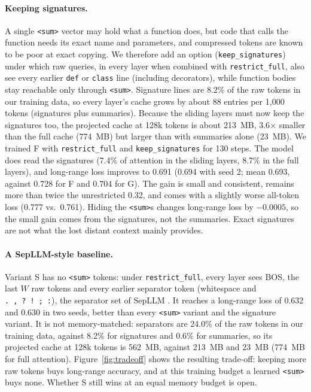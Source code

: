 \documentclass[11pt]{article}
\newcommand{\sumtok}{\texttt{<sum>}}
\begin{document}
\paragraph{Keeping signatures.}
A single \sumtok{} vector may hold what a function does, but code that calls
the function needs its exact name and parameters, and compressed tokens are
known to be poor at exact copying. We therefore add an option
(\texttt{keep\_signatures}) under which raw queries, in every layer when
combined with \texttt{restrict\_full}, also see every earlier \texttt{def}
or \texttt{class} line (including decorators), while function bodies stay
reachable only through \sumtok{}. Signature lines are 8.2\% of the raw
tokens in our training data, so every layer's cache grows by about 88
entries per 1{,}000 tokens (signatures plus summaries). Because the sliding
layers must now keep the signatures too, the projected cache at 128k tokens
is about 213~MB, 3.6$\times$ smaller than the full cache (774~MB) but larger
than with summaries alone (23~MB). We trained F with
\texttt{restrict\_full} and \texttt{keep\_signatures} for 130 steps. The
model does read the signatures (7.4\% of attention in the sliding layers,
8.7\% in the full layers), and long-range loss improves to 0.691 (0.694 with
seed 2; mean 0.693, against 0.728 for F and 0.704 for G). The gain is small
and consistent, remains more than twice the unrestricted 0.32, and comes with
a slightly worse all-token loss (0.777 vs.\ 0.761). Hiding the \sumtok{}s changes long-range loss by
$-0.0005$, so the small gain comes from the signatures, not the summaries.
Exact signatures are not what the lost distant context mainly provides.

\paragraph{A SepLLM-style baseline.}
Variant S has no \sumtok{} tokens: under \texttt{restrict\_full}, every layer
sees BOS, the last $W$ raw tokens and every earlier separator token
(whitespace and \texttt{.}~\texttt{,}~\texttt{?}~\texttt{!}~\texttt{;}~\texttt{:}),
the separator set of SepLLM \citep{chen2024sepllm}. It reaches a long-range
loss of 0.632 and 0.630 in two seeds, better than every \sumtok{} variant and the
signature variant. It is not memory-matched: separators are 24.0\% of the raw
tokens in our training data, against 8.2\% for signatures and 0.6\% for
summaries, so its projected cache at 128k tokens is 562~MB, against 213~MB
and 23~MB (774~MB for full attention). Figure~\ref{fig:tradeoff} shows the
resulting trade-off: keeping more raw tokens buys long-range accuracy, and at
this training budget a learned \sumtok{} buys none. Whether S still wins at
an equal memory budget is open.
\end{document}
